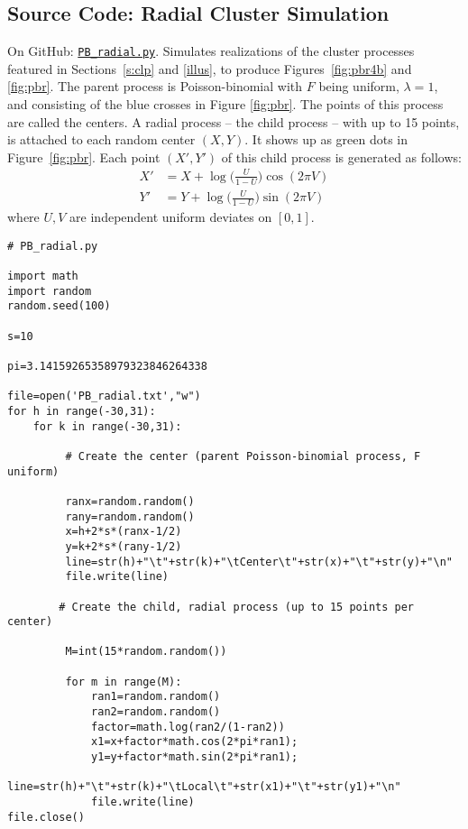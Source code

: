 \documentclass[10pt]{article}
\begin{document}
\subsection{Source Code: Radial Cluster Simulation}\label{s:code2}

{On GitHub}: \href{https://github.com/VincentGranville/Point-Processes/blob/main/Source\%20Code/PB_radial.py}{\texttt{PB\_radial.py}}. Simulates realizations of the cluster processes featured in Sections~\ref{s:clp} and \ref{illus}, to produce
Figures~\ref{fig:pbr4b} and \ref{fig:pbr}. The \textcolor{index}{parent process} is Poisson-binomial with $F$ being uniform, $\lambda=1$, and consisting of the blue crosses in Figure \ref{fig:pbr}. The points of this process are called the centers. A radial process -- the \textcolor{index}{child process} -- with up to 15 points, is attached to each random center $(X, Y)$. It shows up as green dots in Figure~\ref{fig:pbr}.
Each  point $(X', Y')$ of this child process is generated as follows:
\begin{align}
X' & = X + \log\Big(\frac{U}{1-U}\Big) \cos(2\pi V)\nonumber\\
Y' & = Y + \log\Big(\frac{U}{1-U}\Big) \sin(2\pi V)\nonumber
\end{align}
where $U,V$ are independent uniform deviates on $[0,1]$.

\begin{lstlisting}
# PB_radial.py

import math
import random
random.seed(100)

s=10

pi=3.14159265358979323846264338

file=open('PB_radial.txt',"w")
for h in range(-30,31):
    for k in range(-30,31):

         # Create the center (parent Poisson-binomial process, F uniform)

         ranx=random.random()
         rany=random.random()
         x=h+2*s*(ranx-1/2)
         y=k+2*s*(rany-1/2)
         line=str(h)+"\t"+str(k)+"\tCenter\t"+str(x)+"\t"+str(y)+"\n"
         file.write(line)

        # Create the child, radial process (up to 15 points per center)

         M=int(15*random.random())

         for m in range(M):
             ran1=random.random()
             ran2=random.random()
             factor=math.log(ran2/(1-ran2))
             x1=x+factor*math.cos(2*pi*ran1);
             y1=y+factor*math.sin(2*pi*ran1);
             line=str(h)+"\t"+str(k)+"\tLocal\t"+str(x1)+"\t"+str(y1)+"\n"
             file.write(line)
file.close()
\end{lstlisting}
\end{document}
